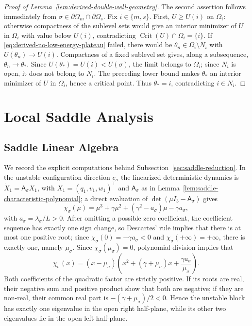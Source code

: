 \documentclass[11pt]{article}
\numberwithin{equation}{section}
\theoremstyle{plain}
\theoremstyle{definition}
\theoremstyle{remark}
\begin{document}
\begin{proof}[Proof of Lemma~\ref{lem:derived-double-well-geometry}]
The second assertion follows immediately from
$\sigma\in\partial\Omega_m\cap\partial\Omega_s$.  Fix $i\in\{m,s\}$.  First,
$U\ge U(i)$ on $\Omega_i$: otherwise compactness of the sublevel sets would
give an interior minimizer of $U$ in $\Omega_i$ with value below $U(i)$,
contradicting $\operatorname{Crit}(U)\cap\Omega_i=\{i\}$.  If
\eqref{eq:derived-no-low-energy-plateau} failed, there would be
$\theta_n\in\Omega_i\setminus N_i$ with $U(\theta_n)\to U(i)$.  Compactness of
a fixed sublevel set gives, along a subsequence, $\theta_n\to\theta_*$.  Since
$U(\theta_*)=U(i)<U(\sigma)$, the limit belongs to $\Omega_i$; since $N_i$ is
open, it does not belong to $N_i$.  The preceding lower bound makes
$\theta_*$ an interior minimizer of $U$ in $\Omega_i$, hence a critical point.
Thus $\theta_*=i$, contradicting $i\in N_i$.
\end{proof}

\section{Local Saddle Analysis}
\label{app:local-saddle-analysis}

\subsection{Saddle Linear Algebra}
\label{app:linear-algebra}

We record the explicit computations behind Subsection~\ref{sec:saddle-reduction}.
In the unstable configuration direction $e_\sigma$ the linearized deterministic
dynamics is $\dot X_1=\mathsf A_\sigma X_1$, with
$X_1=(q_1,v_1,w_1)^\top$ and $\mathsf A_\sigma$ as in
Lemma~\ref{lem:saddle-characteristic-polynomial}; a direct evaluation of
$\det(\mu I_{3}-\mathsf A_\sigma)$ gives
\[
\chi_\sigma(\mu)=\mu^3+\gamma\mu^2+(\gamma^2-a_\sigma)\mu-\gamma a_\sigma,
\]
with
$a_\sigma=\lambda_\sigma/L>0$.
After omitting a possible zero coefficient, the coefficient sequence has
exactly one sign change, so Descartes' rule implies that there is at most one
positive root; since $\chi_\sigma(0)=-\gamma a_\sigma<0$ and
$\chi_\sigma(+\infty)=+\infty$, there is exactly one, namely $\mu_\sigma$.
Since $\chi_\sigma(\mu_\sigma)=0$, polynomial division implies that
\[
\chi_\sigma(x)
=(x-\mu_\sigma)
\left(x^2+(\gamma+\mu_\sigma)x
+\frac{\gamma a_\sigma}{\mu_\sigma}\right).
\]
Both coefficients of the quadratic factor are strictly positive.  If its
roots are real, their negative sum and positive product show that both are
negative; if they are non-real, their common real part is
$-(\gamma+\mu_\sigma)/2<0$.  Hence the unstable block has exactly one
eigenvalue in the open right half-plane, while its other two eigenvalues lie
in the open left half-plane.
\end{document}
